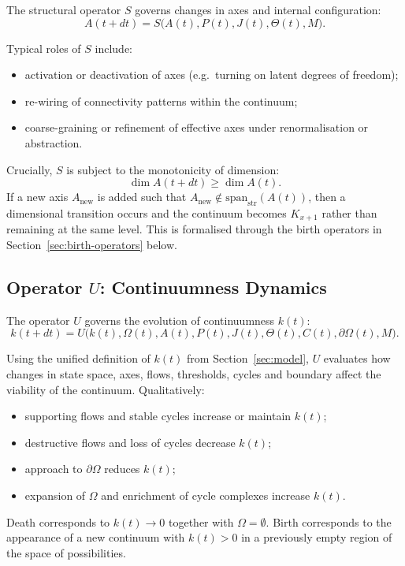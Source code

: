 The structural operator \(S\) governs changes in axes and internal
configuration:
\[
  A(t+dt) = S\big(A(t), P(t), J(t), \Theta(t), M\big).
\]

Typical roles of \(S\) include:
\begin{itemize}
  \item activation or deactivation of axes (e.g.\ turning on latent degrees of
        freedom);
  \item re-wiring of connectivity patterns within the continuum;
  \item coarse-graining or refinement of effective axes under renormalisation
        or abstraction.
\end{itemize}

Crucially, \(S\) is subject to the monotonicity of dimension:
\[
  \dim A(t+dt) \ge \dim A(t).
\]
If a new axis \(A_{\mathrm{new}}\) is added such that
\(A_{\mathrm{new}} \notin \mathrm{span}_{\mathrm{str}}(A(t))\), then a dimensional transition
occurs and the continuum becomes \(K_{x+1}\) rather than remaining at the same
level. This is formalised through the birth operators in
Section~\ref{sec:birth-operators} below.

\subsection{Operator \texorpdfstring{\texorpdfstring{$U$}{U}}{U}: Continuumness Dynamics}

The operator \(U\) governs the evolution of continuumness \(k(t)\):
\[
  k(t+dt) =
  U\big(k(t), \Omega(t), A(t), P(t), J(t),
        \Theta(t), C(t), \partial\Omega(t), M\big).
\]

Using the unified definition of \(k(t)\) from Section~\ref{sec:model}, \(U\)
evaluates how changes in state space, axes, flows, thresholds, cycles and
boundary affect the viability of the continuum. Qualitatively:
\begin{itemize}
  \item supporting flows and stable cycles increase or maintain \(k(t)\);
  \item destructive flows and loss of cycles decrease \(k(t)\);
  \item approach to \(\partial\Omega\) reduces \(k(t)\);
  \item expansion of \(\Omega\) and enrichment of cycle complexes increase
        \(k(t)\).
\end{itemize}

Death corresponds to \(k(t) \to 0\) together with \(\Omega = \emptyset\).
Birth corresponds to the appearance of a new continuum with
\(k(t) > 0\) in a previously empty region of the space of possibilities.

